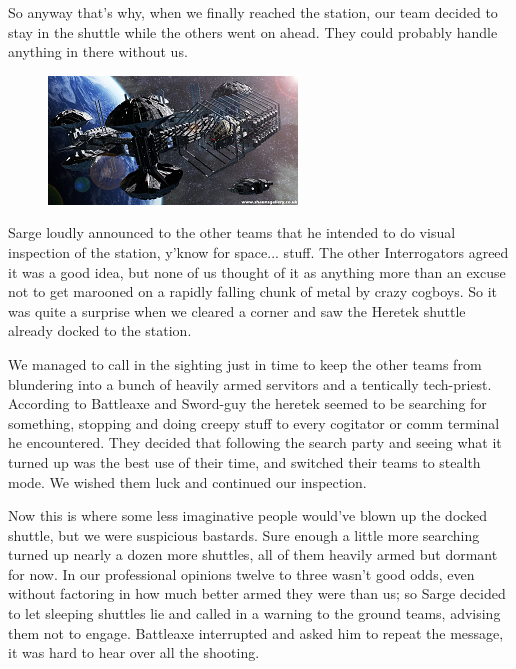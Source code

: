 So anyway that's why, when we finally reached the station, our team decided to stay in the shuttle while the others went on ahead. 
They could probably handle anything in there without us.

\begin{figure}
	\begin{center}
		\includegraphics[width=\figwidth]{pics/11/45.png}
	\end{center}
\end{figure}
Sarge loudly announced to the other teams that he intended to do visual inspection of the station, y'know for space... 
stuff. 
The other Interrogators agreed it was a good idea, but none of us thought of it as anything more than an excuse not to get marooned on a rapidly falling chunk of metal by crazy cogboys. 
So it was quite a surprise when we cleared a corner and saw the Heretek shuttle already docked to the station.

We managed to call in the sighting just in time to keep the other teams from blundering into a bunch of heavily armed servitors and a tentically tech-priest. 
According to Battleaxe and Sword-guy the heretek seemed to be searching for something, stopping and doing creepy stuff to every cogitator or comm terminal he encountered. 
They decided that following the search party and seeing what it turned up was the best use of their time, and switched their teams to stealth mode. 
We wished them luck and continued our inspection.

Now this is where some less imaginative people would've blown up the docked shuttle, but we were suspicious bastards. 
Sure enough a little more searching turned up nearly a dozen more shuttles, all of them heavily armed but dormant for now. 
In our professional opinions twelve to three wasn't good odds, even without factoring in how much better armed they were than us; 
so Sarge decided to let sleeping shuttles lie and called in a warning to the ground teams, advising them not to engage. 
Battleaxe interrupted and asked him to repeat the message, it was hard to hear over all the shooting.

